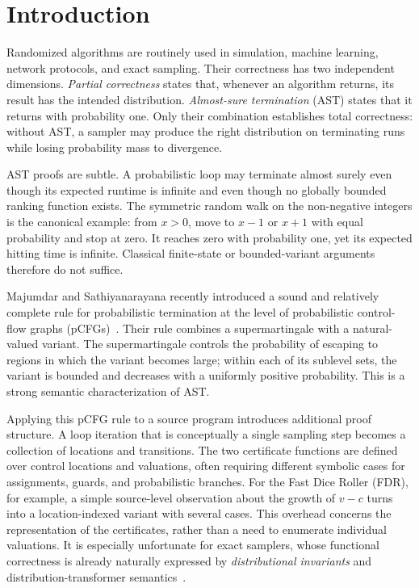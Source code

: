 \section{Introduction}
\label{sec:intro}

Randomized algorithms are routinely used in simulation, machine learning, network protocols, and exact sampling. Their correctness has two independent dimensions. \emph{Partial correctness} states that, whenever an algorithm returns, its result has the intended distribution. \emph{Almost-sure termination} (AST) states that it returns with probability one. Only their combination establishes total correctness: without AST, a sampler may produce the right distribution on terminating runs while losing probability mass to divergence.

AST proofs are subtle. A probabilistic loop may terminate almost surely even though its expected runtime is infinite and even though no globally bounded ranking function exists. The symmetric random walk on the non-negative integers is the canonical example: from $x>0$, move to $x-1$ or $x+1$ with equal probability and stop at zero. It reaches zero with probability one, yet its expected hitting time is infinite. Classical finite-state or bounded-variant arguments therefore do not suffice.

Majumdar and Sathiyanarayana recently introduced a sound and relatively complete rule for probabilistic termination at the level of probabilistic control-flow graphs (pCFGs)~\cite{DBLP:journals/pacmpl/MajumdarS25}. Their rule combines a supermartingale with a natural-valued variant. The supermartingale controls the probability of escaping to regions in which the variant becomes large; within each of its sublevel sets, the variant is bounded and decreases with a uniformly positive probability. This is a strong semantic characterization of AST.

Applying this pCFG rule to a source program introduces additional proof structure. A loop iteration that is conceptually a single sampling step becomes a collection of locations and transitions. The two certificate functions are defined over control locations and valuations, often requiring different symbolic cases for assignments, guards, and probabilistic branches. For the Fast Dice Roller (FDR), for example, a simple source-level observation about the growth of $v-c$ turns into a location-indexed variant with several cases. This overhead concerns the representation of the certificates, rather than a need to enumerate individual valuations. It is especially unfortunate for exact samplers, whose functional correctness is already naturally expressed by \emph{distributional invariants} and distribution-transformer semantics~\cite{zilken2026verifyingsamplingalgorithmsdistributional}.

